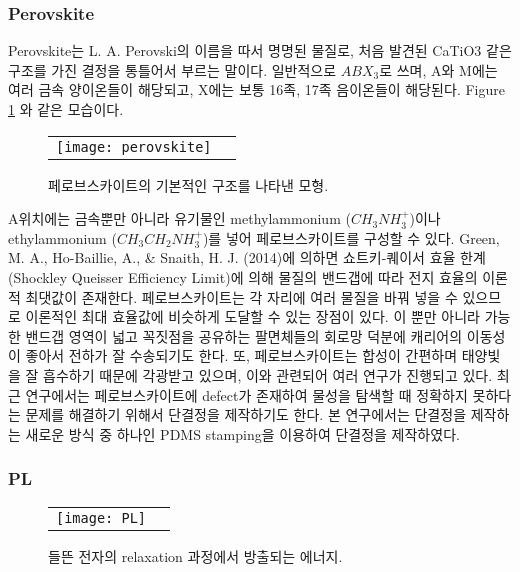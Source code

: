 \subsubsection{Perovskite}
Perovskite는 L. A. Perovski의 이름을 따서 명명된 물질로, 처음 발견된 CaTiO3  같은 구조를 가진 결정을 통틀어서 부르는 말이다. 일반적으로 $ABX_3$로 쓰며, A와 M에는 여러 금속 양이온들이 해당되고, X에는 보통 16족, 17족 음이온들이 해당된다. Figure \ref{fig:perov} 와 같은 모습이다.
\begin{figure}[H]
	\begin{center}
		\begin{tabular}{cc}
			\texttt{[image: perovskite]}
		\end{tabular}
	\end{center}
	\caption{페로브스카이트의 기본적인 구조를 나타낸 모형.}
	\label{fig:perov} 
\end{figure}
A위치에는 금속뿐만 아니라 유기물인  methylammonium ($CH_3NH_3^+$)이나 ethylammonium ($CH_3CH_2NH_3^+$)를 넣어 페로브스카이트를 구성할 수 있다. Green, M. A., Ho-Baillie, A., & Snaith, H. J. (2014)에 의하면 쇼트키-퀘이서 효율 한계(Shockley Queisser Efficiency Limit)에 의해 물질의 밴드갭에 따라 전지 효율의 이론적 최댓값이 존재한다\cite{green2014emergence}. 페로브스카이트는 각 자리에 여러 물질을 바꿔 넣을 수 있으므로 이론적인 최대 효율값에 비슷하게 도달할 수  있는 장점이 있다. 이 뿐만 아니라 가능한 밴드갭 영역이 넓고 꼭짓점을 공유하는 팔면체들의 회로망 덕분에 캐리어의 이동성이 좋아서 전하가 잘 수송되기도 한다\cite{green2014emergence}.
또, 페로브스카이트는 합성이 간편하며 태양빛을 잘 흡수하기 때문에 각광받고 있으며, 이와 관련되어 여러 연구가 진행되고 있다. 최근 연구에서는 페로브스카이트에 defect가 존재하여 물성을 탐색할 때 정확하지 못하다는 문제를 해결하기 위해서 단결정을 제작하기도 한다. 본 연구에서는 단결정을 제작하는 새로운 방식 중 하나인 PDMS stamping을 이용하여 단결정을 제작하였다.


\subsubsection{PL}

\begin{figure}[H]
	\begin{center}
		\begin{tabular}{cc}
			\texttt{[image: PL]}
		\end{tabular}
	\end{center}
	\caption{들뜬 전자의 relaxation 과정에서 방출되는 에너지.}
	\label{fig:pl} 
\end{figure}

